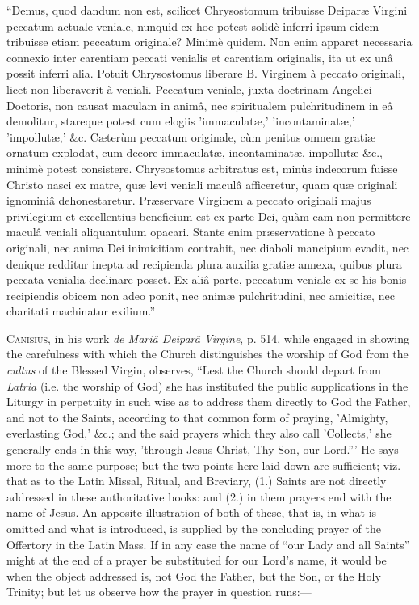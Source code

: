 ``Demus, quod dandum non est, scilicet Chrysostomum tribuisse
Deiparæ Virgini peccatum actuale veniale, nunquid ex hoc potest solidè
inferri ipsum eidem tribuisse etiam peccatum originale? Minimè quidem.
Non enim apparet necessaria connexio inter carentiam peccati venialis et
carentiam originalis, ita ut ex unâ possit inferri alia. Potuit
Chrysostomus liberare B. Virginem à peccato originali, licet non
liberaverit à veniali. Peccatum veniale, juxta doctrinam Angelici
Doctoris, non causat maculam in animâ, nec spiritualem pulchritudinem
in eâ demolitur, stareque potest cum elogiis 'immaculatæ,' 'incontaminatæ,'
'impollutæ,' \&c. Cæterùm peccatum originale, cùm penitus omnem
gratiæ ornatum explodat, cum decore immaculatæ, incontaminatæ,
impollutæ \&c., minimè potest consistere. Chrysostomus arbitratus
est, minùs indecorum fuisse Christo nasci ex matre, quæ levi veniali
maculâ afficeretur, quam quæ originali ignominiâ dehonestaretur.
Præservare Virginem a peccato originali majus privilegium et
excellentius beneficium est ex parte Dei, quàm eam non permittere
maculâ veniali aliquantulum opacari. Stante enim præservatione à
peccato originali, nec anima Dei inimicitiam contrahit, nec diaboli
mancipium evadit, nec denique redditur inepta ad recipienda plura
auxilia gratiæ annexa, quibus plura peccata venialia declinare posset.
Ex aliâ parte, peccatum veniale ex se his bonis recipiendis obicem non
adeo ponit, nec animæ pulchritudini, nec amicitiæ, nec charitati
machinatur exilium.''









C\textsc{anisius}, in his work \emph{de Mariâ Deiparâ
Virgine}, p. 514, while engaged in showing the carefulness with which
the Church distinguishes the worship of God from the \emph{cultus} of
the Blessed Virgin, observes, ``Lest the Church should depart from \emph{Latria}
(i.e. the worship of God) she has instituted the public supplications in
the Liturgy in perpetuity in such wise as to address them directly to
God the Father, and not to the Saints, according to that common form of
praying, 'Almighty, everlasting God,' \&c.; and the said prayers
which they also call 'Collects,' she generally ends in this way,
'through Jesus Christ, Thy Son, our Lord.''' He says more to the
same purpose; but the two points here laid down are sufficient; viz.
that as to the Latin Missal, Ritual, and Breviary, (1.) Saints are not
directly addressed in these authoritative books: and (2.) in them
prayers end with the name of Jesus. An apposite illustration of both of
these, that is, in what is omitted and what is introduced, is supplied
by the concluding prayer of the Offertory in the Latin Mass. If in any
case the name of ``our Lady and all Saints'' might at the end of
a prayer be substituted for our Lord's name, it would be when the
object addressed is, not God the Father, but the Son, or the Holy
Trinity; but let us observe how the prayer in question runs:—


